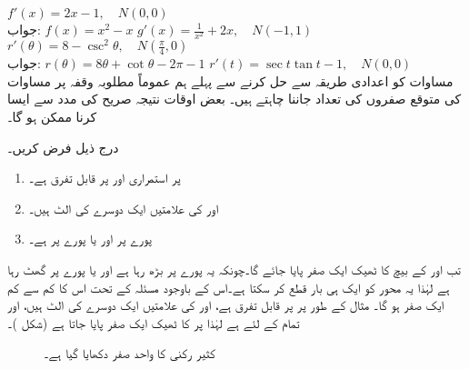 $f'(x)=2x-1,\quad N(0,0)$\\
جواب:\quad
$f(x)=x^2-x$
$g'(x)=\tfrac{1}{x^2}+2x,\quad N(-1,1)$
$r'(\theta)=8-\csc^2\theta,\quad N(\tfrac{\pi}{4},0)$\\
جواب:\quad
$r(\theta)=8\theta+\cot \theta-2\pi-1$
$r'(t)=\sec t\tan t-1,\quad N(0,0)$
\\
مساوات  کو اعدادی طریقہ سے حل کرنے سے پہلے ہم عموماً  مطلوبہ وقفہ پر  مساوات کی متوقع صفروں کی تعداد جاننا چاہتے ہیں۔ بعض اوقات نتیجہ صریح  کی مدد سے ایسا کرنا ممکن ہو گا۔

درج ذیل فرض کریں۔
\begin{enumerate}[1.]
\item
{} پر  استمراری اور  پر قابل تفرق ہے۔
\item
{} اور  کی علامتیں ایک دوسرے کی الٹ ہیں۔
\item
پورے  پر  اور یا پورے  پر  ہے۔
\end{enumerate}
تب  اور  کے بیچ  کا ٹھیک ایک صفر پایا جائے گا۔چونکہ یہ پورے  پر بڑھ رہا ہے اور یا  پورے  پر گھٹ رہا ہے لہٰذا یہ  محور کو ایک ہی بار قطع کر سکتا ہے۔اس کے باوجود مسئلہ  کے تحت اس کا کم سے کم ایک صفر ہو گا۔ مثال کے طور پر  پر  قابل تفرق ہے،  اور  کی علامتیں ایک دوسرے کی الٹ ہیں، اور تمام  کے لئے  ہے  لہٰذا  پر  کا ٹھیک ایک صفر پایا جاتا ہے (شکل )۔
\begin{figure}
\centering
{}
\caption{کثیر رکنی  کا واحد صفر دکھایا گیا ہے۔}
\label{شکل_استعمال_یک_صفر_مثال}
\end{figure}

